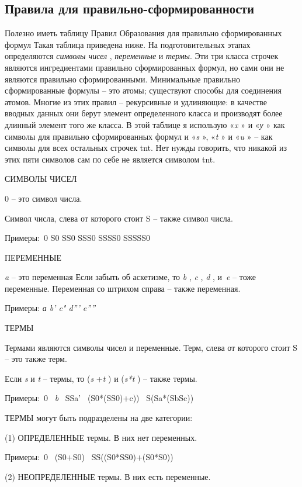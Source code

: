 \documentclass[../main.tex]{subfiles}
\begin{document}
\subsection{Правила для правильно-сформированности}

Полезно иметь таблицу Правил Образования для правильно сформированных формул Такая таблица приведена ниже. На подготовительных этапах определяются \emph{символы чисел} , \emph{переменные} и \emph{термы}. Эти три класса строчек являются ингредиентами правильно сформированных формул, но сами они не являются правильно сформированными. Минимальные правильно сформированные формулы \--- это атомы; существуют способы для соединения атомов. Многие из этих правил \--- рекурсивные и удлиняющие: в качестве вводных данных они берут элемент определенного класса и производят более длинный элемент того же класса. В этой таблице я использую «\emph{x} » и «\emph{у} » как символы для правильно сформированных формул и «\emph{s} », «\emph{t} » и «\emph{u} » \--- как символы для всех остальных строчек \acs{tnt}. Нет нужды говорить, что никакой из этих пяти символов сам по себе не является символом \acs{tnt}.

СИМВОЛЫ ЧИСЕЛ

0 \--- это символ числа.

Символ числа, слева от которого стоит S \--- также символ числа.

Примеры:~0 S0 SS0 SSS0 SSSS0 SSSSS0

ПЕРЕМЕННЫЕ

\emph{a} \--- это переменная Если забыть об аскетизме, то \emph{b} , \emph{c} , \emph{d} , и~\emph{e} \--- тоже переменные. Переменная со штрихом справа \--- также переменная.

Примеры: \emph{а b' c" d''' e''''}

ТЕРМЫ

Термами являются символы чисел и переменные. Терм, слева от которого стоит S \--- это также терм.

Если \emph{s} и \emph{t} \--- термы, то (\emph{s} +\emph{t} ) и (\emph{s*t} ) \--- также термы.

Примеры:~0~ \emph{b} ~SSa' ~(S0*(SS0)+c))~ S(Sa*(SbSc))

ТЕРМЫ могут быть подразделены на две категории:

(1) ОПРЕДЕЛЕННЫЕ термы. В них нет переменных.

Примеры:~0 ~(S0+S0) ~SS((S0*SS0)+(S0*S0))

(2) НЕОПРЕДЕЛЕННЫЕ термы. В них есть переменные.
\end{document}
